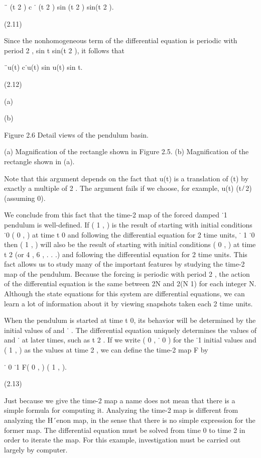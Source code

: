 \documentclass[12pt]{article}
\begin{document}
¨ (t  2  )  c ˙ (t  2  )  sin (t  2  )  
 sin(t  2  ).

(2.11)

Since the nonhomogeneous term of the differential equation is periodic with period 2  , sin t  sin(t  2  ), it follows that

¨u(t)  c˙u(t)  sin u(t)  
 sin t.

(2.12)

(a)

(b)

Figure 2.6 Detail views of the pendulum basin.

(a) Magniﬁcation of the rectangle shown in Figure 2.5. (b) Magniﬁcation of the rectangle shown in (a).


Note that this argument depends on the fact that u(t) is a translation of (t) by exactly a multiple of 2  . The argument fails if we 
choose, for example, u(t)  (t   ̸ 2) (assuming 
  0).


We conclude from this fact that the time-2  map of the forced damped ˙1  pendulum is well-deﬁned. If ( 1 , ) is the result of 
starting with initial conditions ˙0  ( 0 , ) at time t  0 and following the differential equation for 2  time units, ˙ 1 ˙0  then ( 1 
, ) will also be the result of starting with initial conditions ( 0 , ) at time t  2  (or 4  , 6  , . . .) and following the 
differential equation for 2  time units. This fact allows us to study many of the important features by studying the time-2  map of 
the pendulum. Because the forcing is periodic with period 2  , the action of the differential equation is the same between 2N  and 
2(N  1)  for each integer N. Although the state equations for this system are differential equations, we can learn a lot of 
information about it by viewing snapshots taken each 2  time units.

When the pendulum is started at time t  0, its behavior will be determined by the initial values of and ˙ . The differential equation 
uniquely determines the values of and ˙ at later times, such as t  2  . If we write ( 0 , ˙ 0 ) for the ˙1  initial values and ( 1 , 
) as the values at time 2  , we can deﬁne the time-2  map F by

˙ 0 ˙1  F( 0 , )  ( 1 , ).

(2.13)

Just because we give the time-2  map a name does not mean that there is a simple formula for computing it. Analyzing the time-2  map 
is different from analyzing the H´enon map, in the sense that there is no simple expression for the former map. The differential 
equation must be solved from time 0 to time 2  in order to iterate the map. For this example, investigation must be carried out 
largely by computer.
\end{document}

